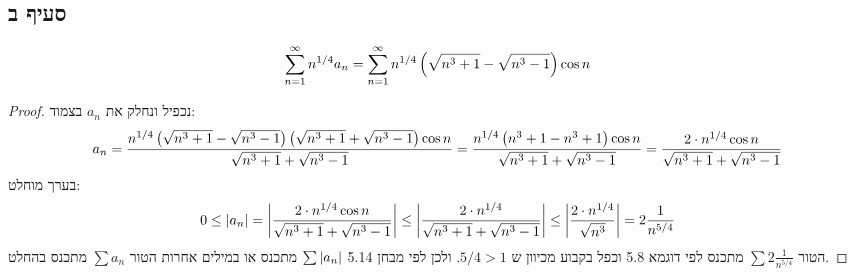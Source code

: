 \documentclass{article}
\begin{document}
		\subsection*{סעיף ב}
		\[
			\sum^\infty_{n=1} n^{1/4} a_n = \sum^\infty_{n=1} n^{1/4} \left( \sqrt{n^3+1} - \sqrt{n^3 -1} \right) \cos n
		\]
		\begin{proof}
			נכפיל ונחלק את $a_n$ בצמוד:
			\begin{align*}
				a_n
				= \frac{n^{1/4} \left( \sqrt{n^3+1} - \sqrt{n^3 -1} \right)\left( \sqrt{n^3+1} + \sqrt{n^3 -1} \right) \cos n}{\sqrt{n^3+1} + \sqrt{n^3 -1}}
				= \frac{n^{1/4} \left( n^3 + 1 - n^3 + 1 \right) \cos n}{\sqrt{n^3+1} + \sqrt{n^3 -1}}
				= \frac{2 \cdot n^{1/4} \cos n}{\sqrt{n^3+1} + \sqrt{n^3 -1}}
			\end{align*}
			בערך מוחלט:
			\begin{align*}
				0 \leq \left| a_n \right|
				= \left| \frac{2 \cdot n^{1/4} \cos n}{\sqrt{n^3+1} + \sqrt{n^3 -1}} \right|
				\leq \left| \frac{2 \cdot n^{1/4}}{\sqrt{n^3+1} + \sqrt{n^3 -1}} \right|
				\leq \left| \frac{2 \cdot n^{1/4}}{\sqrt{n^3}} \right|
				= 2\frac{1}{n^{5/4}}
			\end{align*}
		הטור $\sum 2\frac{1}{n^{5/4}}$ מתכנס לפי דוגמא 5.8 וכפל בקבוע מכיוון ש $5/4>1$.
		ולכן לפי מבחן 5.14 $\sum \left| a_n \right|$ מתכנס או במילים אחרות הטור $\sum a_n$ מתכנס בהחלט.
		\end{proof}
\end{document}
